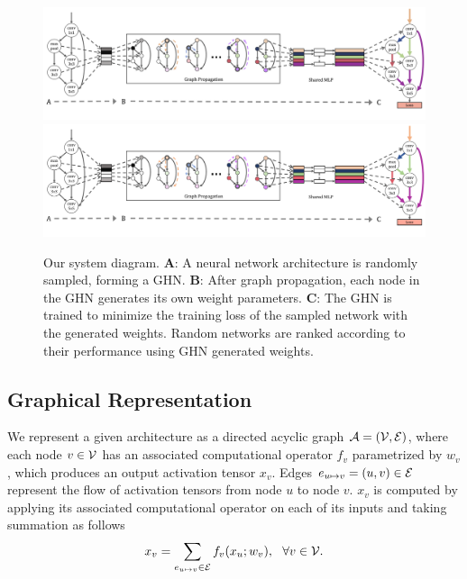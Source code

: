 \begin{figure}
\vspace{-0.9cm}
\iflatexml
\includegraphics[width=6\linewidth]{figures/main3.png}
\else
\includegraphics[width=\linewidth]{figures/main3.pdf}
\fi
\vspace{-1cm}
\caption{Our system diagram. \textbf{A}: A neural network architecture
is randomly sampled, forming a GHN. \textbf{B}: After graph propagation, each node in the GHN
generates its own weight parameters. \textbf{C}: The GHN is trained to minimize the training loss of
the sampled network with the generated weights. Random networks are ranked according to their
performance using GHN generated weights. }
\label{fig:main}
\vspace{-0.3cm}
\end{figure}

\subsection{Graphical Representation}
We represent a given architecture as a directed acyclic graph ${\mathcal{A}} = ({\mathcal{V}}, {\mathcal{E}})$, where each node $v
\in {\mathcal{V}}$  has an associated computational operator $f_v$ parametrized by $w_v$, which produces an
output activation tensor $x_v$. Edges $e_{u \mapsto v} = (u, v) \in {\mathcal{E}}$ represent the flow of
activation tensors from node $u$ to node $v$. $x_v$ is computed by applying its associated
computational operator on each of its inputs and taking summation as follows
\begin{equation}
\label{eq:compute_node}
x_v = \sum_{e_{u \mapsto v} \in {\mathcal{E}}} f_v(x_u; w_v), \ \ \forall v \in {\mathcal{V}}.
\end{equation}

